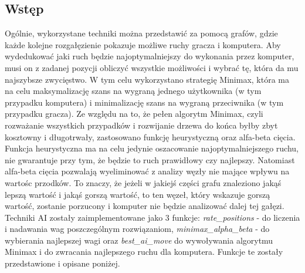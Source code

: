 \documentclass[12pt]{article}
\begin{document}
\subsection{Wstęp}
Ogólnie, wykorzystane techniki można przedstawić za pomocą grafów, gdzie każde kolejne rozgałęzienie pokazuje możliwe ruchy gracza i komputera. Aby wydedukować jaki ruch będzie najoptymalniejszy do wykonania przez komputer, musi on z zadanej pozycji obliczyć wszystkie możliwości i wybrać tę, która da mu najszybsze zwycięstwo. W tym celu wykorzystano strategię Minimax, która ma na celu maksymalizację szans na wygraną jednego użytkownika (w tym przypadku komputera) i minimalizację szans na wygraną przeciwnika (w tym przypadku gracza). Ze względu na to, że pełen algorytm Minimax, czyli rozważanie wszystkich przypadków i rozwijanie drzewa do końca byłby zbyt kosztowny i długotrwały, zastosowano funkcję heurystyczną oraz alfa-beta cięcia. Funkcja heurystyczna ma na celu jedynie oszacowanie najoptymalniejszego ruchu, nie gwarantuje przy tym, że będzie to ruch prawidłowy czy najlepszy. Natomiast alfa-beta cięcia pozwalają wyeliminować z analizy węzły nie mające wpływu na wartośc przodków. To znaczy, że jeżeli w jakiejś części grafu znaleziono jakąś lepszą wartość i jakąś gorszą wartość, to ten węzeł, który wskazuje gorszą wartość, zostanie porzucony i komputer nie będzie analizować dalej tej gałęzi. Techniki AI zostały zaimplementowane jako 3 funkcje: \textit{rate\_positions} - do liczenia i nadawania wag poszczególnym rozwiązaniom, \textit{minimax\_alpha\_beta} - do wybierania najlepszej wagi oraz \textit{best\_ai\_move} do wywoływania algorytmu Minimax i do zwracania najlepszego ruchu dla komputera. Funkcje te zostały przedstawione i opisane poniżej.
\end{document}
